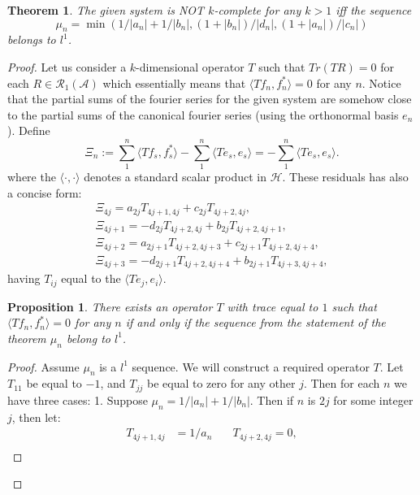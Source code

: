 \documentclass[12pt]{article}
\renewcommand{\cal}[1]{\mathcal{#1}}
\newtheorem{theorem}{Theorem}
\newtheorem{prop}{Proposition}
\theoremstyle{definition}
\numberwithin{remark}{section}
\numberwithin{theorem}{section}
\numberwithin{prop}{section}
\numberwithin{equation}{section}
\numberwithin{lemma}{section}
\numberwithin{prop_under_lemma}{lemma}
\begin{document}
    \begin{theorem}
        The given system is NOT $k$-complete for any $k > 1$ iff the sequence
        $$
            \mu_n = \min(1/|a_n| + 1/|b_n|, (1 + |b_n|)/|d_n|, (1 + |a_n|)/|c_n|)
        $$ belongs to $l^1$.
    \end{theorem}
    \begin{proof}
        Let us consider a $k$-dimensional operator $T$ such that 
        $Tr(TR) = 0$ for each $R \in \cal{R}_1(\cal{A})$ which essentially means that
        $\langle Tf_n, f_n^* \rangle = 0$ for any $n$. 
        Notice that the partial sums of the fourier series for the given system are somehow close to the
        partial sums of the canonical fourier series (using the orthonormal basis $e_n$). Define
        $$
          \Xi_n := \sum_1^n \langle Tf_s, f_s^* \rangle - \sum_1^n \langle Te_s, e_s \rangle = -\sum_1^n \langle Te_s, e_s \rangle.
        $$
        where the $\langle \cdot, \cdot\rangle$ denotes a standard scalar product in $\cal{H}$.
        These residuals has also a concise form:
        \begin{align*}
            \Xi_{4j} = a_{2j} T_{4j+1, 4j} + c_{2j} T_{4j+2, 4j},\\
            \Xi_{4j + 1} = -d_{2j} T_{4j+2, 4j} + b_{2j} T_{4j+2, 4j+1},\\
            \Xi_{4j + 2} = a_{2j+1} T_{4j+2, 4j+3} + c_{2j+1} T_{4j+2, 4j+4},\\
            \Xi_{4j + 3} = -d_{2j+1} T_{4j+2, 4j+4} + b_{2j+1} T_{4j+3, 4j+4},
        \end{align*}
        having $T_{ij}$ equal to the $\langle Te_j, e_i\rangle$.
        \begin{prop}
            \label{inf-dim-statement}
            There exists an operator $T$ with trace equal to $1$ such that
            $\langle Tf_n, f_n^*\rangle = 0$ for any $n$ if and only if the
            sequence from the statement of the theorem $\mu_n$ belong to $l^1$.
        \end{prop}
        \begin{proof}
            Assume $\mu_n$ is a $l^1$ sequence. We will construct a required operator $T$.
            Let $T_{11}$ be equal to $-1$, and $T_{jj}$ be equal to zero for any other $j$.
            Then for each $n$ we have three cases:
            1. Suppose $\mu_n = 1/|a_n| + 1/|b_n|$. Then if $n$ is $2j$ for some integer $j$, then
            let:
            \begin{align*}
                T_{4j+1,4j}&=1/a_n & \quad T_{4j+2,4j} = 0,\\

\end{align*}
\end{proof}
\end{proof}
\end{document}
